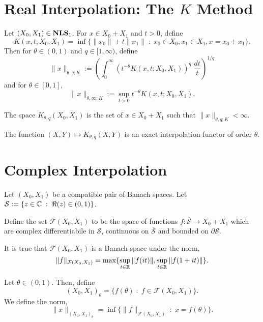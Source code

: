 \section{Real Interpolation: The $K$ Method}
\begin{definition}
\label{Kdefinition}
    Let $(X_0,X_1) \in \mathrm{\mathbf{NLS}}_1$. For $x \in X_0+X_1$ and $t > 0$, define
    \begin{equation*}
        K(x,t;X_0,X_1) = \inf\{ \|x_0\|+t\|x_1\|\;:\;x_0 \in X_0,x_1 \in X_1,x = x_0+x_1\}.
    \end{equation*}
    Then for $\theta \in (0,1)$ and $q \in [1,\infty)$, define
    \begin{equation*}
        \|x\|_{\theta,q;K} := \left(\int_0^\infty (t^{-\theta}K(x,t;X_0,X_1))^q\;\frac{dt}{t}\right)^{1/q}
    \end{equation*}
    and for $\theta \in [0,1]$,
    \begin{equation*}
        \|x\|_{\theta,\infty;K} := \sup_{t > 0} t^{-\theta} K(x,t;X_0,X_1).
    \end{equation*}
    
    The space $K_{\theta,q}(X_0,X_1)$ is the set of $x \in X_0+X_1$
    such that $\|x\|_{\theta,q;K} < \infty$.
    
\end{definition}

\begin{proposition}
    The function $(X,Y) \mapsto K_{\theta,q}(X,Y)$ is an exact interpolation functor
    of order $\theta$.
\end{proposition}

\section{Complex Interpolation}
\begin{definition}
    Let $(X_0,X_1)$ be a compatible pair of Banach spaces. Let $\mathcal{S} := \{z \in \mathbb{C}\;:\;\Re(z) \in (0,1)\}$. 
    
    Define the set $\mathcal{F}(X_0,X_1)$ to be the space of functions $f:\overline{\mathcal{S}}\rightarrow X_0+X_1$ which are complex differentiabile in $\mathcal{S}$, continuous on $\overline{\mathcal{S}}$
    and bounded on $\partial \mathcal{S}$.
    
    It is true that $\mathcal{F}(X_0,X_1)$ is a Banach space under the norm,
    \begin{equation*}
        \|f\|_{\mathcal{F}(X_0,X_1)} = \max\{\sup_{t \in \mathbb{R}} \|f(it)\|,\sup_{t \in \mathbb{R}}\|f(1+it)\|\}.
    \end{equation*}
    
    Let $\theta \in (0,1)$. Then, define
    \begin{equation*}
        (X_0,X_1)_\theta = \{ f(\theta)\;:\;f \in \mathcal{F}(X_0,X_1)\}.
    \end{equation*}
    We define the norm,
    \begin{equation*}
        \|x\|_{(X_0,X_1)_\theta} = \inf\{\|f\|_{\mathcal{F}(X_0,X_1)} \;:\;x = f(\theta)\}.
    \end{equation*}
\end{definition}

